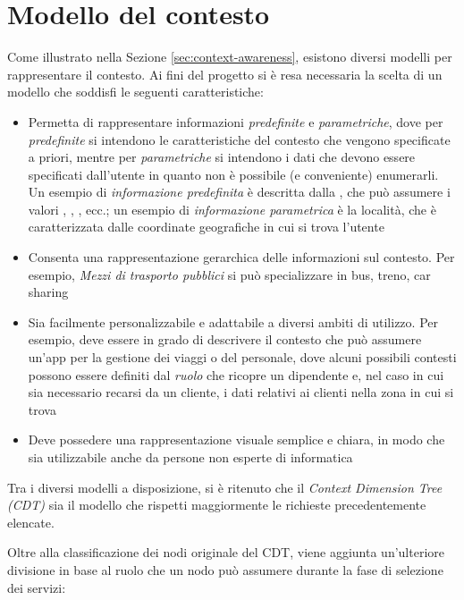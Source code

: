 \section{Modello del contesto\label{sec:modello-contesto}}

Come illustrato nella Sezione \ref{sec:context-awareness}, esistono diversi modelli per rappresentare il contesto. Ai fini del progetto si è resa necessaria la scelta di un modello che soddisfi le seguenti caratteristiche:

\begin{itemize}
	\item Permetta di rappresentare informazioni \emph{predefinite} e \emph{parametriche}, dove per \emph{predefinite} si intendono le caratteristiche del contesto che vengono specificate a priori, mentre per \emph{parametriche} si intendono i dati che devono essere specificati dall'utente in quanto non è possibile (e conveniente) enumerarli. Un esempio di \emph{informazione predefinita} è descritta dalla , che può assumere i valori , , , ecc.; un esempio di \emph{informazione parametrica} è la località, che è caratterizzata dalle coordinate geografiche in cui si trova l'utente
	\item Consenta una rappresentazione gerarchica delle informazioni sul contesto. Per esempio, \emph{Mezzi di trasporto pubblici} si può specializzare in bus, treno, car sharing
	\item Sia facilmente personalizzabile e adattabile a diversi ambiti di utilizzo. Per esempio, deve essere in grado di descrivere il contesto che può assumere un'app per la gestione dei viaggi o del personale, dove alcuni possibili contesti possono essere definiti dal \emph{ruolo} che ricopre un dipendente e, nel caso in cui sia necessario recarsi da un cliente, i dati relativi ai clienti nella zona in cui si trova
	\item Deve possedere una rappresentazione visuale semplice e chiara, in modo che sia utilizzabile anche da persone non esperte di informatica
\end{itemize}

Tra i diversi modelli a disposizione, si è ritenuto che il \emph{Context Dimension Tree (CDT)} sia il modello che rispetti maggiormente le richieste precedentemente elencate.

Oltre alla classificazione dei nodi originale del CDT, viene aggiunta un'ulteriore divisione in base al ruolo che un nodo può assumere durante la fase di selezione dei servizi:

